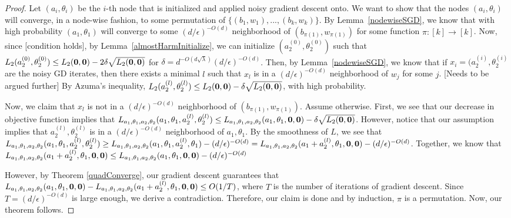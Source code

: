 \begin{proof}
Let $(a_i, \theta_i)$ be the $i$-th node that is initialized and applied noisy gradient descent onto. We want to show that the nodes $(a_i, \theta_i)$ will converge, in a node-wise fashion, to some permutation of $\{(b_1,w_1),...,(b_k,w_k)\}$. By Lemma~\ref{nodewiseSGD}, we know that with high probability $(a_1,\theta_1)$ will converge to some $(d/\epsilon)^{-O(d)}$ neighborhood of $(b_{\pi(1)}, w_{\pi(1)})$ for some function $\pi: [k] \to [k]$. Now, since [condition holds], by Lemma~\ref{almostHarmInitialize}, we can initialize ${(a_2^{(0)},\theta_2^{(0)})}$ such that $L_2({a_2^{(0)},\theta_2^{(0)}}) \leq  L_2({\bf 0,0}) - 2\delta \sqrt{L_2({\bf 0,0})}$ for $\delta = d^{-O(d\sqrt{\lambda})}(d/\epsilon)^{-O(d)}$. Then, by Lemma~\ref{nodewiseSGD}, we know that if $x_i = (a_2^{(i)}, \theta_2^{(i)}$ are the noisy GD iterates, then there exists a minimal $l$ such that $x_l$ is in a $(d/\epsilon)^{-O(d)}$ neighborhood of $w_j$ for some $j$. [Needs to be argued further] By Azuma's inequality, $L_2({a_2^{(l)},\theta_2^{(l)}}) \leq  L_2({\bf 0,0}) - \delta \sqrt{L_2({\bf 0,0})}$, with high probability. 

Now, we claim that $x_l$ is not in a $(d/\epsilon)^{-O(d)}$ neighborhood of $(b_{\pi(1)}, w_{\pi(1)})$. Assume otherwise. First, we see that our decrease in objective function implies that $L_{a_1,\theta_1,a_2,\theta_2}(a_1,\theta_1, a_2^{(l)},\theta_2^{(l)}) \leq L_{a_1,\theta_1,a_2,\theta_2}(a_1,\theta_1, {\bf 0,0}) - \delta \sqrt{L_2({\bf 0,0})}$. However, notice that our assumption implies that $a_2^{(l)},\theta_2^{(l)}$ is in a $(d/\epsilon)^{-O(d)}$ neighborhood of $a_1,\theta_1$. By the smoothness of $L$, we see that $L_{a_1,\theta_1,a_2,\theta_2}(a_1,\theta_1, a_2^{(l)},\theta_2^{(l)}) \geq L_{a_1,\theta_1,a_2,\theta_2}(a_1,\theta_1, a_2^{(l)},\theta_1) - (d/\epsilon)^{-O(d)} = L_{a_1,\theta_1,a_2,\theta_2}(a_1 + a_2^{(l)},\theta_1, {\bf 0, 0}) - (d/\epsilon)^{-O(d)} $. Together, we know that  $L_{a_1,\theta_1,a_2,\theta_2}(a_1+a_2^{(l)},\theta_1,{\bf 0, 0}) \leq L_{a_1,\theta_1,a_2,\theta_2}(a_1,\theta_1, {\bf 0,0}) - (d/\epsilon)^{-O(d)}$

However, by Theorem \ref{quadConverge}, our gradient descent guarantees that $L_{a_1,\theta_1,a_2,\theta_2}(a_1,\theta_1, {\bf 0,0}) - L_{a_1,\theta_1,a_2,\theta_2}(a_1 + a_2^{(l)},\theta_1, {\bf 0, 0}) \leq O(1/T)$, where $T$ is the number of iterations of gradient descent. Since $T = (d/\epsilon)^{-O(d)}$ is large enough, we derive a contradiction. Therefore, our claim is done and by induction, $\pi$ is a permutation. Now, our theorem follows. 
\end{proof}

